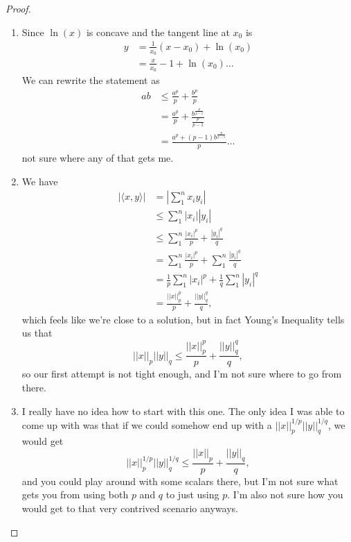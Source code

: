 \documentclass[12pt]{article}
\theoremstyle{definition}
\begin{document}
\begin{proof}\
	\begin{enumerate}[label=(\alph*)]
		\item Since $\ln(x)$ is concave and the tangent line at $x_0$ is \begin{align*}
			      y & = \frac{1}{x_0}(x-x_0) + \ln(x_0)   \\
			        & = \frac{x}{x_0} - 1 + \ln(x_0)\dots
		      \end{align*}
		      We can rewrite the statement as \begin{align*}
			      ab & \leq \frac{a^p}{p} + \frac{b^p}{p}                        \\
			         & = \frac{a^p}{p} + \frac{b^{\frac{p}{p-1}}}{\frac{p}{p-1}} \\
			         & = \frac{a^p + (p-1)b^{\frac{p}{p-1}}}{p}\dots
		      \end{align*}
		      not sure where any of that gets me.
		\item We have \begin{align*}
			      |\langle x, y \rangle| & = \left|\sum_1^n x_iy_i\right|                                \\
			                             & \leq \sum_1^n |x_i||y_i|                                      \\
			                             & \leq \sum_1^n \frac{|x_i|^p}{p}+ \frac{|y_i|^q}{q}            \\
			                             & = \sum_1^n \frac{|x_i|^p}{p} + \sum_1^n \frac{|y_i|^q}{q}     \\
			                             & = \frac{1}{p} \sum_1^n |x_i|^p + \frac{1}{q} \sum_1^n |y_i|^q \\
			                             & = \frac{||x||_p^p}{p}  + \frac{||y||_q^q}{q} ,
		      \end{align*}
		      which feels like we're close to a solution, but in fact Young's Inequality tells us that \begin{equation*}
			      ||x||_p||y||_q \leq \frac{||x||_p^p}{p} + \frac{||y||_q^q}{q},
		      \end{equation*}
		      so our first attempt is not tight enough, and I'm not sure where to go from there.
		\item I really have no idea how to start with this one.
		      The only idea I was able to come up with was that if we could somehow end up with a $||x||_p^{1/p}||y||_q^{1/q}$, we would get \begin{equation*}
			      ||x||_p^{1/p}||y||_q^{1/q} \leq \frac{||x||_p}{p} + \frac{||y||_q}{q},
		      \end{equation*}
		      and you could play around with some scalars there, but I'm not sure what gets you from using both $p$ and $q$ to just using $p$.
		      I'm also not sure how you would get to that very contrived scenario anyways.
	\end{enumerate}
\end{proof}
\end{document}
